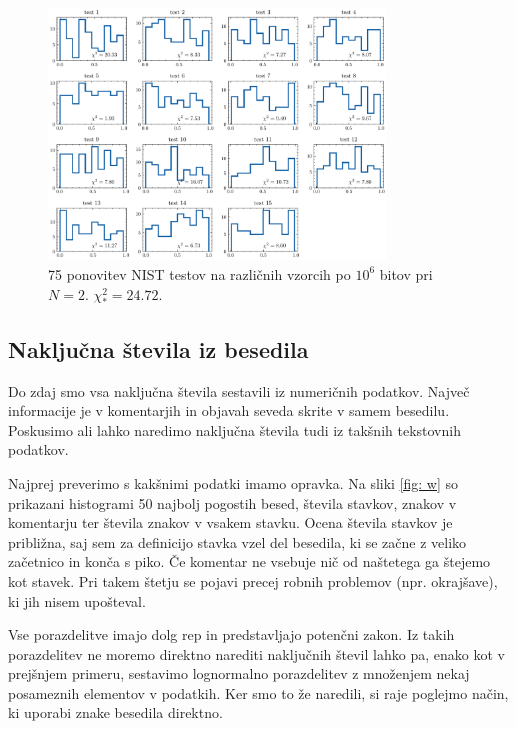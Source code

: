 \documentclass[11pt, oneside]{article}
\theoremstyle{definition}
\begin{document}
\begin{figure}[h!]
    \centering
    \includegraphics[width=0.8\textwidth]{p_test_dist.pdf}
    \caption{75 ponovitev NIST testov na različnih vzorcih po $10^6$ bitov pri $N=2$. $\chi^2_*=24.72$.}
    \label{fig: pdist}
\end{figure}

\newpage

\subsection{Naključna števila iz besedila}
Do zdaj smo vsa naključna števila sestavili iz numeričnih podatkov.
Največ informacije je v komentarjih in objavah seveda skrite v samem besedilu.
Poskusimo ali lahko naredimo naključna števila tudi iz takšnih tekstovnih podatkov.

Najprej preverimo s kakšnimi podatki imamo opravka. Na sliki \ref{fig: w} so prikazani histogrami 50 najbolj pogostih besed,
števila stavkov, znakov v komentarju ter števila znakov v vsakem stavku. Ocena števila stavkov je približna,
saj sem za definicijo stavka vzel del besedila, ki se začne z veliko začetnico in konča s piko.
Če komentar ne vsebuje nič od naštetega ga štejemo kot stavek.
Pri takem štetju se pojavi precej robnih problemov (npr. okrajšave), ki jih nisem upošteval.

Vse porazdelitve imajo dolg rep in predstavljajo potenčni zakon.  Iz takih porazdelitev ne moremo
direktno narediti naključnih števil lahko pa, enako kot v prejšnjem primeru, sestavimo lognormalno porazdelitev
z množenjem nekaj posameznih elementov v podatkih.
Ker smo to že naredili, si raje poglejmo način, ki uporabi znake besedila direktno.
\end{document}
